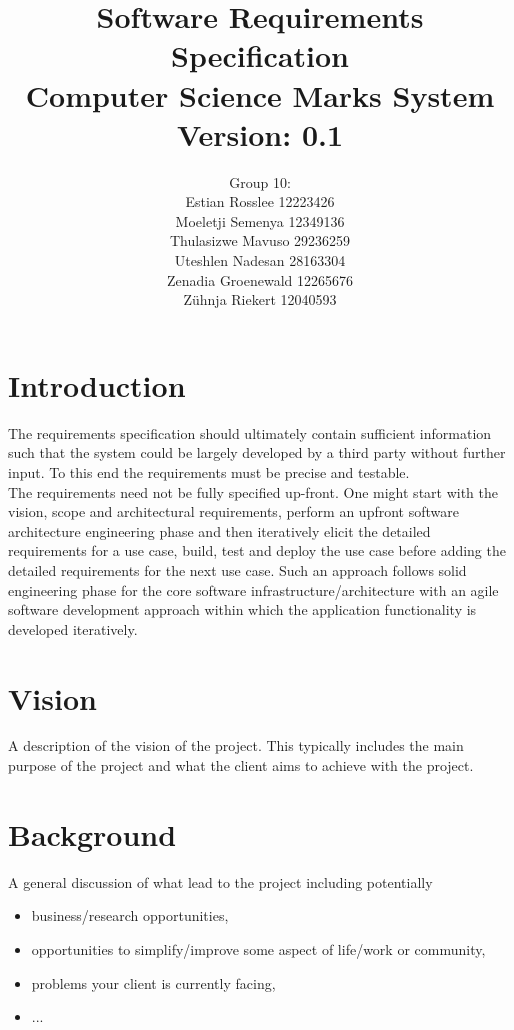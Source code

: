 \documentclass[11pt,a4paper]{article}
\begin{document}
\begin{titlepage}
\title{Software Requirements Specification\\Computer Science Marks System\\ \small Version: 0.1}
\author{Group 10: \\Estian Rosslee 12223426\\Moeletji Semenya 12349136\\Thulasizwe Mavuso 29236259\\Uteshlen Nadesan 28163304\\Zenadia Groenewald 12265676\\Z\"uhnja Riekert 12040593}
\maketitle
\end{titlepage}
\pagebreak
\tableofcontents
\pagebreak
\section{Introduction}
The requirements specification should ultimately contain sufficient information such that the system could be largely developed by a third party without further input. To this end the requirements must be precise and testable.
\\

The requirements need not be fully specified up-front. One might start with the vision, scope and architectural requirements, perform an upfront software architecture engineering phase and then iteratively elicit the detailed requirements for a use case, build, test and deploy the use case before adding the detailed requirements for the next use case. Such an approach follows solid engineering phase for the core software infrastructure/architecture with an agile software development approach within which the application functionality is developed iteratively.
\section{Vision}
A description of the vision of the project. This typically includes the main purpose of the project and what the client aims to achieve with the project.
\section{Background}
A general discussion of what lead to the project including potentially
\begin{itemize}
\item business/research opportunities,
\item opportunities to simplify/improve some aspect of life/work or community,
\item problems your client is currently facing,
\item ...
\end{itemize}
\end{document}

